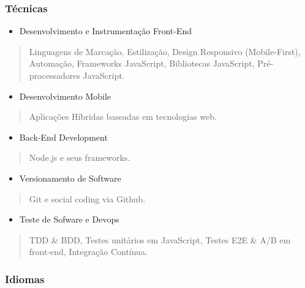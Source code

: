 \documentclass[]{article}
\providecommand{\tightlist}{%
  \setlength{\itemsep}{0pt}\setlength{\parskip}{0pt}}
\begin{document}
\subsubsection{Técnicas}\label{tuxe9cnicas}

\begin{itemize}
\tightlist
\item
  Desenvolvimento e Instrumentação Front-End
\end{itemize}

\begin{quote}
Linguagens de Marcação, Estilização, Design Responsivo (Mobile-First),
Automação, Frameworks JavaScript, Bibliotecas JavaScript,
Pré-processadores JavaScript.
\end{quote}

\begin{itemize}
\tightlist
\item
  Desenvolvimento Mobile
\end{itemize}

\begin{quote}
Aplicações Híbridas baseadas em tecnologias web.
\end{quote}

\begin{itemize}
\tightlist
\item
  Back-End Development
\end{itemize}

\begin{quote}
Node.js e seus frameworks.
\end{quote}

\begin{itemize}
\tightlist
\item
  Versionamento de Software
\end{itemize}

\begin{quote}
Git e social coding via Github.
\end{quote}

\begin{itemize}
\tightlist
\item
  Teste de Sofware e Devops
\end{itemize}

\begin{quote}
TDD \& BDD, Testes unitários em JavaScript, Testes E2E \& A/B em
front-end, Integração Contínua.
\end{quote}

\subsubsection{Idiomas}\label{idiomas}
\end{document}
